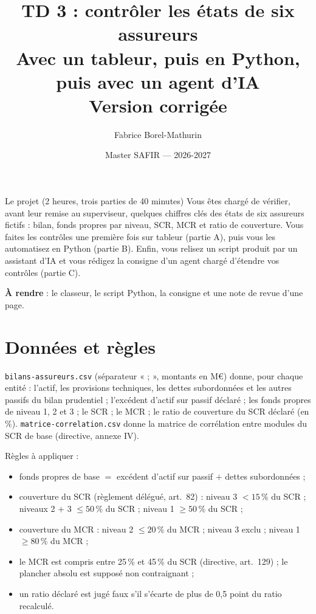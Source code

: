 \documentclass[11pt,a4paper]{article}
\title{\vspace{-1.5cm}\sffamily\bfseries\color{bleuactu}
       TD 3 : contrôler les états de six assureurs\\[2mm]
       \large\mdseries\color{black}Avec un tableur, puis en Python, puis avec un agent d'IA
       \ifcorrection\\[1mm]\color{vertactu}Version corrigée\fi}
\author{\sffamily Fabrice Borel-Mathurin}
\date{\sffamily\small Master SAFIR --- 2026-2027}
\begin{document}
\maketitle
\thispagestyle{empty}

\begin{notion}{Le projet (2 heures, trois parties de 40 minutes)}
Vous êtes chargé de vérifier, avant leur remise au superviseur, quelques chiffres clés des états
de six assureurs fictifs : bilan, fonds propres par niveau, SCR, MCR et ratio de couverture.
Vous faites les contrôles une première fois sur tableur (partie A), puis vous les automatisez en
Python (partie B). Enfin, vous relisez un script produit par un assistant d'IA et vous rédigez la
consigne d'un agent chargé d'étendre vos contrôles (partie C).

\smallskip
\textbf{À rendre} : le classeur, le script Python, la consigne et une note de revue d'une page.
\end{notion}

\section{Données et règles}

\texttt{bilans-assureurs.csv} (séparateur « ; », montants en M\euro) donne, pour chaque entité :
l'actif, les provisions techniques, les dettes subordonnées et les autres passifs du bilan
prudentiel ; l'excédent d'actif sur passif déclaré ; les fonds propres de niveau 1, 2 et 3 ; le
SCR ; le MCR ; le ratio de couverture du SCR déclaré (en \%). \texttt{matrice-correlation.csv}
donne la matrice de corrélation entre modules du SCR de base (directive, annexe IV).

\smallskip
\noindent Règles à appliquer :
\begin{itemize}[nosep]
  \item fonds propres de base $=$ excédent d'actif sur passif $+$ dettes subordonnées ;
  \item couverture du SCR (règlement délégué, art.~82) : niveau 3 $< 15\,\%$ du SCR ; niveaux 2 $+$ 3
        $\leq 50\,\%$ du SCR ; niveau 1 $\geq 50\,\%$ du SCR ;
  \item couverture du MCR : niveau 2 $\leq 20\,\%$ du MCR ; niveau 3 exclu ; niveau 1 $\geq 80\,\%$ du MCR ;
  \item le MCR est compris entre 25\,\% et 45\,\% du SCR (directive, art.~129) ; le plancher absolu
        est supposé non contraignant ;
  \item un ratio déclaré est jugé faux s'il s'écarte de plus de 0,5 point du ratio recalculé.
\end{itemize}
\end{document}
